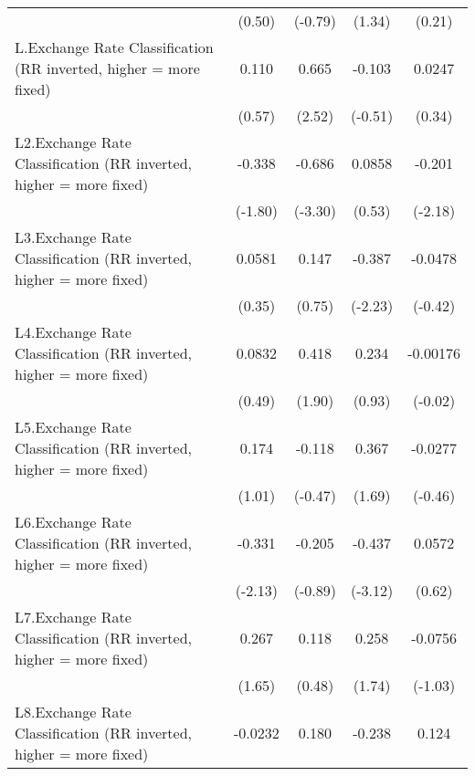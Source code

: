 {\begin{longtable}{l*{4}{c}}
                &   (0.50)         &  (-0.79)         &   (1.34)         &   (0.21)         \\
[1em]
L.Exchange Rate Classification (RR inverted, higher = more fixed)&    0.110         &    0.665\sym{*}  &   -0.103         &   0.0247         \\
                &   (0.57)         &   (2.52)         &  (-0.51)         &   (0.34)         \\
[1em]
L2.Exchange Rate Classification (RR inverted, higher = more fixed)&   -0.338         &   -0.686\sym{***}&   0.0858         &   -0.201\sym{*}  \\
                &  (-1.80)         &  (-3.30)         &   (0.53)         &  (-2.18)         \\
[1em]
L3.Exchange Rate Classification (RR inverted, higher = more fixed)&   0.0581         &    0.147         &   -0.387\sym{*}  &  -0.0478         \\
                &   (0.35)         &   (0.75)         &  (-2.23)         &  (-0.42)         \\
[1em]
L4.Exchange Rate Classification (RR inverted, higher = more fixed)&   0.0832         &    0.418         &    0.234         & -0.00176         \\
                &   (0.49)         &   (1.90)         &   (0.93)         &  (-0.02)         \\
[1em]
L5.Exchange Rate Classification (RR inverted, higher = more fixed)&    0.174         &   -0.118         &    0.367         &  -0.0277         \\
                &   (1.01)         &  (-0.47)         &   (1.69)         &  (-0.46)         \\
[1em]
L6.Exchange Rate Classification (RR inverted, higher = more fixed)&   -0.331\sym{*}  &   -0.205         &   -0.437\sym{**} &   0.0572         \\
                &  (-2.13)         &  (-0.89)         &  (-3.12)         &   (0.62)         \\
[1em]
L7.Exchange Rate Classification (RR inverted, higher = more fixed)&    0.267         &    0.118         &    0.258         &  -0.0756         \\
                &   (1.65)         &   (0.48)         &   (1.74)         &  (-1.03)         \\
[1em]
L8.Exchange Rate Classification (RR inverted, higher = more fixed)&  -0.0232         &    0.180         &   -0.238         &    0.124         \\

\end{longtable}}
